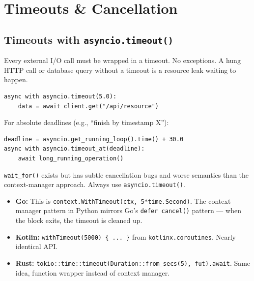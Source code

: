 \documentclass[11pt,a4paper,oneside]{book}
\newcommand{\py}[1]{\texttt{\color{pyblue}#1}}
\newcommand{\gocode}[1]{\texttt{\color{goblue}#1}}
\newcommand{\rustcode}[1]{\texttt{\color{BrickRed}#1}}
\newcommand{\javacode}[1]{\texttt{\color{javaorange!80!black}#1}}
\begin{document}
\chapter{Timeouts \& Cancellation}

\section{Timeouts with \py{asyncio.timeout()}}

Every external I/O call must be wrapped in a timeout. No exceptions. A hung HTTP call or
database query without a timeout is a resource leak waiting to happen.

\begin{lstlisting}[style=python]
async with asyncio.timeout(5.0):
    data = await client.get("/api/resource")
\end{lstlisting}

For absolute deadlines (e.g., ``finish by timestamp X''):

\begin{lstlisting}[style=python]
deadline = asyncio.get_running_loop().time() + 30.0
async with asyncio.timeout_at(deadline):
    await long_running_operation()
\end{lstlisting}

\begin{dangerbox}[title={Do not use \py{asyncio.wait\_for()}}]
\py{wait\_for()} exists but has subtle cancellation bugs and worse semantics than the
context-manager approach. Always use \py{asyncio.timeout()}.
\end{dangerbox}

\begin{analogybox}
\begin{itemize}
    \item \textcolor{goblue}{\textbf{Go:}} This is \gocode{context.WithTimeout(ctx, 5*time.Second)}.
          The context manager pattern in Python mirrors Go's \texttt{defer cancel()} pattern ---
          when the block exits, the timeout is cleaned up.
    \item \textcolor{javaorange}{\textbf{Kotlin:}} \javacode{withTimeout(5000) \{ ... \}}
          from \texttt{kotlinx.coroutines}. Nearly identical API.
    \item \textcolor{BrickRed}{\textbf{Rust:}} \rustcode{tokio::time::timeout(Duration::from\_secs(5), fut).await}.
          Same idea, function wrapper instead of context manager.
\end{itemize}
\end{analogybox}
\end{document}
